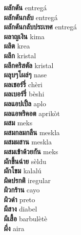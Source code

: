 \textbf{ ผลักดัน  } entregá \\
\textbf{ ผลักดันกลับ  } entregá \\
\textbf{ ผลักดันกลับประเทศ  } entregá \\
\textbf{ ผลาญเงิน  } kima \\
\textbf{ ผลิต  } krea \\
\textbf{ ผลึก  } kristal \\
\textbf{ ผลึกคริสตัล  } kristal \\
\textbf{ ผลุบๆโผล่ๆ  } nase \\
\textbf{ ผลเชอร์รี่  } chèri \\
\textbf{ ผลเบอร์รี่  } bèshi \\
\textbf{ ผลแอปเปิ้ล  } aplo \\
\textbf{ ผลแอพริคอต  } aprikòt \\
\textbf{ ผสม  } meks \\
\textbf{ ผสมกลมกลืน  } meskla \\
\textbf{ ผสมผสาน  } meskla \\
\textbf{ ผสมเข้าด้วยกัน  } meks \\
\textbf{ ผักขึ้นฉ่าย  } sèldu \\
\textbf{ ผักโขม  } kalalú \\
\textbf{ ผิดปรกติ  } iregular \\
\textbf{ ผิวกร้าน  } cayo \\
\textbf{ ผิวดำ  } preto \\
\textbf{ ผีสาง  } diabel \\
\textbf{ ผีเสื้อ  } barbulètè \\
\textbf{ ผึ่ง  } aira \\
